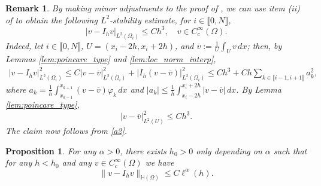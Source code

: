 \documentclass[10 pt]{article}
\newcommand\inter[1]{\llbracket #1\rrbracket}
\newtheorem{remark}[theorem]{Remark}
\newtheorem{proposition}[theorem]{Proposition}
\numberwithin{equation}{section}
\begin{document}
\begin{remark}\label{rem:l2_stability}
By making minor adjustments to the proof of  , we can use item (ii) of  to obtain the following $L^2$-stability estimate, for $i\in\inter{0,N}$,
%
\begin{equation*}
    |v-I_hv|_{L^2(\Omega_i)} \leq C h^3, \quad  v\in C_c^\infty(\Omega).
\end{equation*}
Indeed, let $i\in\inter{0,N}$, $U=({x_i-2h},{x_{i}+2h})$, and $\overline{v}:=\frac{1}{U}\int_U v\, dx$; then, by Lemmas \ref{lem:poincare_type} and \ref{lem:loc_norm_interp},
\begin{align}
|v-I_hv|^2_{L^2(\Omega_i)}
\leq C|v-\overline{v}|_{L^2(\Omega_i)}^2 +|I_h(v-\overline{v})|^2_{L^2(\Omega_i)}
\leq Ch^3+Ch\sum_{k\in \inter{i-1,i+1}}a_k^2,\label{a2}
\end{align}
where $a_k=\frac{1}{h}\int_{x_{k-1}}^{x_{k+1}} (v-\overline{v})\varphi_k\, dx$ and $|a_k|\leq \frac{1}{h}\int_{x_i-2h}^{x_{i}+2h}|v-\overline{v}|\, dx$. By Lemma \ref{lem:poincare_type},
\begin{equation}
    |v-\overline{v}|_{L^2(U)}^2\leq Ch^3.
\end{equation}
The claim now follows from \eqref{a2}.
\end{remark}

\begin{proposition}\label{eq:estab_H_c_infty}
For any $\alpha>0$, there exists $h_0>0$ only depending on $\alpha$ such that for any $h<h_0$ and any $v\in C_c^\infty(\Omega)$ we have
%
\begin{equation}\label{eq:rate_H_c_infty}
    \|v-I_h v\|_{\mathbb H(\Omega)}\leq C\ell^\alpha(h).
\end{equation}
%
\end{proposition}
\end{document}
